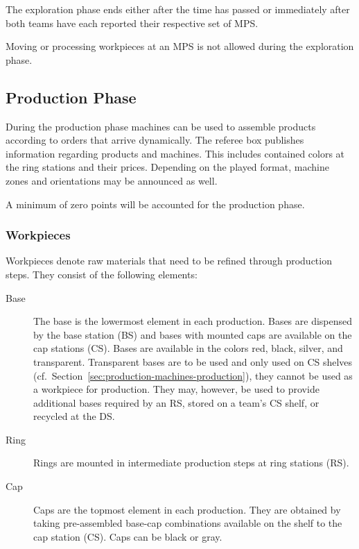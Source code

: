 \documentclass[12pt,twoside]{article}
\newcommand{\refsec}[1]{Section~\ref{#1}}
\begin{document}
The exploration phase ends either after the time has passed or
immediately after both teams have each reported their respective set
of MPS\@.

Moving or processing workpieces at an MPS is not allowed during the
exploration phase.



\subsection{Production Phase}
\label{sec:production-phase}
During the production phase machines can be used to assemble products
according to orders that arrive dynamically.
The referee box publishes information regarding products and machines.
This includes contained colors at the ring stations and their
prices.
Depending on the played format, machine zones and orientations may be announced
as well.

A minimum of zero points will be accounted for the production phase.

\subsubsection{Workpieces}
\label{sec:workpieces}
Workpieces denote raw materials that need to be refined through production
steps.
They consist of the following elements:
\begin{description}
\item[Base] The base is the lowermost element in each production.
  Bases are dispensed by the base station (BS) and bases with mounted
  caps are available on the cap stations (CS). Bases are available in
  the colors red, black, silver, and transparent. Transparent bases
  are to be used and only used on CS shelves
  (cf.~\refsec{sec:production-machines-production}), they cannot be
  used as a workpiece for production. They may, however, be used to
  provide additional bases required by an RS, stored on a team's CS
  shelf, or recycled at the DS\@.
\item[Ring] Rings are mounted in intermediate production steps at ring
  stations (RS).
\item[Cap] Caps are the topmost element in each production. They are
  obtained by taking pre-assembled base-cap combinations available on
  the shelf to the cap station (CS). Caps can be black or gray.
\end{description}
\end{document}
